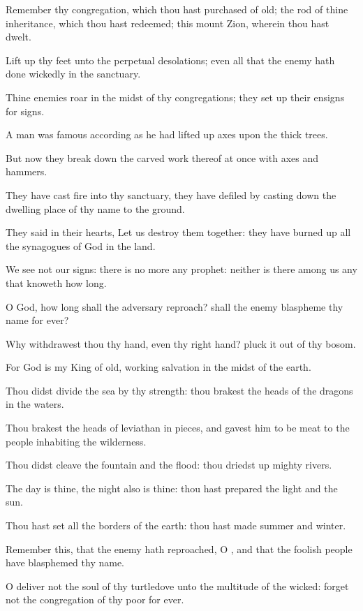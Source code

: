 \verse Remember thy congregation, which thou hast purchased of old; the rod of thine inheritance, which thou hast redeemed; this mount Zion, wherein thou hast dwelt.

\verse Lift up thy feet unto the perpetual desolations; even all that the enemy hath done wickedly in the sanctuary.

\verse Thine enemies roar in the midst of thy congregations; they set up their ensigns for signs.

\verse A man was famous according as he had lifted up axes upon the thick trees.

\verse But now they break down the carved work thereof at once with axes and hammers.

\verse They have cast fire into thy sanctuary, they have defiled by casting down the dwelling place of thy name to the ground.

\verse They said in their hearts, Let us destroy them together: they have burned up all the synagogues of God in the land.

\verse We see not our signs: there is no more any prophet: neither is there among us any that knoweth how long.

\verse O God, how long shall the adversary reproach? shall the enemy blaspheme thy name for ever?

\verse Why withdrawest thou thy hand, even thy right hand? pluck it out of thy bosom.

\verse For God is my King of old, working salvation in the midst of the earth.

\verse Thou didst divide the sea by thy strength: thou brakest the heads of the dragons in the waters.

\verse Thou brakest the heads of leviathan in pieces, and gavest him to be meat to the people inhabiting the wilderness.

\verse Thou didst cleave the fountain and the flood: thou driedst up mighty rivers.

\verse The day is thine, the night also is thine: thou hast prepared the light and the sun.

\verse Thou hast set all the borders of the earth: thou hast made summer and winter.

\verse Remember this, that the enemy hath reproached, O \LORD, and that the foolish people have blasphemed thy name.

\verse O deliver not the soul of thy turtledove unto the multitude of the wicked: forget not the congregation of thy poor for ever.

